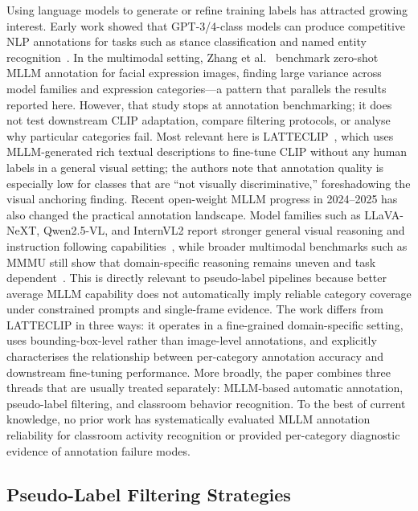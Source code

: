 \documentclass{ieeeaccess}
\begin{document}
Using language models to generate or refine training labels has
attracted growing interest.
Early work showed that GPT-3/4-class models can produce competitive NLP
annotations for tasks such as stance classification and named entity
recognition~\cite{gilardi2023chatgpt,he2023annollm}.
In the multimodal setting, Zhang et al.~\cite{zhang2024zero} benchmark
zero-shot MLLM annotation for facial expression images, finding large
variance across model families and expression categories---a pattern
that parallels the results reported here.
However, that study stops at annotation benchmarking; it does not test
downstream CLIP adaptation, compare filtering protocols, or analyse why
particular categories fail.
Most relevant here is LATTECLIP~\cite{cao2025latteclip}, which
uses MLLM-generated rich textual descriptions to fine-tune CLIP without
any human labels in a general visual setting; the authors note that
annotation quality is especially low for classes that are ``not
visually discriminative,'' foreshadowing the visual anchoring
finding.
Recent open-weight MLLM progress in 2024--2025 has also changed the
practical annotation landscape.
Model families such as LLaVA-NeXT, Qwen2.5-VL, and InternVL2 report
stronger general visual reasoning and instruction following
capabilities~\cite{liu2024llavanext,qwen2025technical,chen2024internvl2},
while broader multimodal benchmarks such as MMMU still show that
domain-specific reasoning remains uneven and task dependent~\cite{yue2024mmmu}.
This is directly relevant to pseudo-label pipelines because better
average MLLM capability does not automatically imply reliable category
coverage under constrained prompts and single-frame evidence.
The work differs from LATTECLIP in three ways: it operates in a
fine-grained domain-specific setting, uses bounding-box-level rather
than image-level annotations, and explicitly characterises the
relationship between per-category annotation accuracy and downstream
fine-tuning performance.
More broadly, the paper combines three threads that are usually
treated separately: MLLM-based automatic annotation, pseudo-label
filtering, and classroom behavior recognition.
To the best of current knowledge, no prior work has systematically evaluated MLLM
annotation reliability for classroom activity recognition or provided
per-category diagnostic evidence of annotation failure modes.

\subsection{Pseudo-Label Filtering Strategies}
\end{document}
